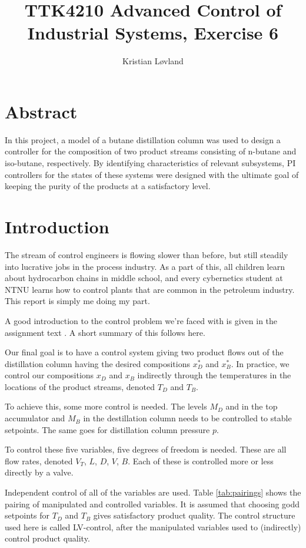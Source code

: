 \documentclass[12pt]{article}
\title{TTK4210 Advanced Control of Industrial Systems, Exercise 6}
\date{}
\author{Kristian Løvland}
\begin{document}
\maketitle
\tableofcontents

\newpage
\section{Abstract}
In this project, a model of a butane distillation column was used to design a controller for the composition of two product streams consisting of n-butane and iso-butane, respectively. By identifying characteristics of relevant subsystems, PI controllers for the states of these systems were designed with the ultimate goal of keeping the purity of the products at a satisfactory level.

\newpage
\section{Introduction}
The stream of control engineers is flowing slower than before, but still steadily into lucrative jobs in the process industry. As a part of this, all children learn about hydrocarbon chains in middle school, and every cybernetics student at NTNU learns how to control plants that are common in the petroleum industry. This report is simply me doing my part.

A good introduction to the control problem we're faced with is given in the assignment text . A short summary of this follows here.

Our final goal is to have a control system giving two product flows out of the distillation column having the desired compositions $x_D^*$ and $x_B^*$. In practice, we control our compositions $x_D$ and $x_B$ indirectly through the temperatures in the locations of the product streams, denoted $T_D$ and $T_B$.

To achieve this, some more control is needed. The levels $M_D$ and in the top accumulator and $M_B$ in the destillation column needs to be controlled to stable setpoints. The same goes for distillation column pressure $p$.

To control these five variables, five degrees of freedom is needed. These are all flow rates, denoted $V_T$, $L$, $D$, $V$, $B$. Each of these is controlled more or less directly by a valve.

Independent control of all of the variables are used. Table \ref{tab:pairings} shows the pairing of manipulated and controlled variables. It is assumed that choosing godd setpoints for $T_D$ and $T_B$ gives satisfactory product quality. The control structure used here is called LV-control, after the manipulated variables used to (indirectly) control product quality.
\end{document}
